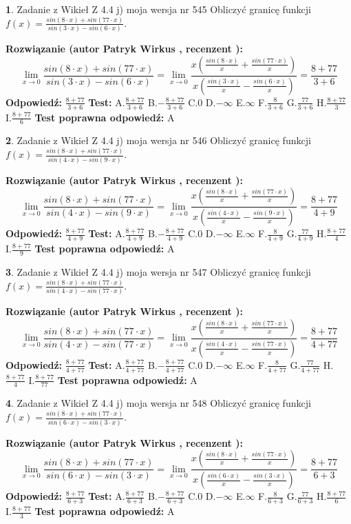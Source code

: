 \documentclass[12pt, a4paper]{article}
\theoremstyle{definition} %
\newtheorem{zad}{}
\newcommand{\zadStart}[1]{\begin{zad}#1\newline}
\newcommand{\zadStop}{\end{zad}}
\newcommand{\rozwStart}[2]{\noindent \textbf{Rozwiązanie (autor #1 , recenzent #2): }\newline}
\newcommand{\rozwStop}{\newline}
\newcommand{\odpStart}{\noindent \textbf{Odpowiedź:}\newline}
\newcommand{\odpStop}{\newline}
\newcommand{\testStart}{\noindent \textbf{Test:}\newline}
\newcommand{\testStop}{\newline}
\newcommand{\kluczStart}{\noindent \textbf{Test poprawna odpowiedź:}\newline}
\newcommand{\kluczStop}{\newline}
\begin{document}
\zadStart{Zadanie z Wikieł Z 4.4 j) moja wersja nr 545}
Obliczyć granicę funkcji $f(x)=\frac{sin(8\cdot x) +sin(77\cdot x)}{sin(3\cdot x) -sin(6\cdot x)}$.
\zadStop
\rozwStart{Patryk Wirkus}{}
$$\lim\limits_{x\to 0}\frac{sin(8\cdot x) +sin(77\cdot x)}{sin(3\cdot x) -sin(6\cdot x)}=\lim\limits_{x\to 0}\frac{x(\frac{sin(8\cdot x)}{x}+\frac{sin(77\cdot x)}{x})}{x(\frac{sin(3\cdot x)}{x}-\frac{sin(6\cdot x)}{x})}=\frac{8+77}{3+6}$$
\rozwStop
\odpStart
$\frac{8+77}{3+6}$
\odpStop
\testStart
A.$\frac{8+77}{3+6}$
B.$-\frac{8+77}{3+6}$
C.$0$
D.$-\infty$
E.$\infty$
F.$\frac{8}{3+6}$
G.$\frac{77}{3+6}$
H.$\frac{8+77}{3}$
I.$\frac{8+77}{6}$
\testStop
\kluczStart
A
\kluczStop



\zadStart{Zadanie z Wikieł Z 4.4 j) moja wersja nr 546}
Obliczyć granicę funkcji $f(x)=\frac{sin(8\cdot x) +sin(77\cdot x)}{sin(4\cdot x) -sin(9\cdot x)}$.
\zadStop
\rozwStart{Patryk Wirkus}{}
$$\lim\limits_{x\to 0}\frac{sin(8\cdot x) +sin(77\cdot x)}{sin(4\cdot x) -sin(9\cdot x)}=\lim\limits_{x\to 0}\frac{x(\frac{sin(8\cdot x)}{x}+\frac{sin(77\cdot x)}{x})}{x(\frac{sin(4\cdot x)}{x}-\frac{sin(9\cdot x)}{x})}=\frac{8+77}{4+9}$$
\rozwStop
\odpStart
$\frac{8+77}{4+9}$
\odpStop
\testStart
A.$\frac{8+77}{4+9}$
B.$-\frac{8+77}{4+9}$
C.$0$
D.$-\infty$
E.$\infty$
F.$\frac{8}{4+9}$
G.$\frac{77}{4+9}$
H.$\frac{8+77}{4}$
I.$\frac{8+77}{9}$
\testStop
\kluczStart
A
\kluczStop



\zadStart{Zadanie z Wikieł Z 4.4 j) moja wersja nr 547}
Obliczyć granicę funkcji $f(x)=\frac{sin(8\cdot x) +sin(77\cdot x)}{sin(4\cdot x) -sin(77\cdot x)}$.
\zadStop
\rozwStart{Patryk Wirkus}{}
$$\lim\limits_{x\to 0}\frac{sin(8\cdot x) +sin(77\cdot x)}{sin(4\cdot x) -sin(77\cdot x)}=\lim\limits_{x\to 0}\frac{x(\frac{sin(8\cdot x)}{x}+\frac{sin(77\cdot x)}{x})}{x(\frac{sin(4\cdot x)}{x}-\frac{sin(77\cdot x)}{x})}=\frac{8+77}{4+77}$$
\rozwStop
\odpStart
$\frac{8+77}{4+77}$
\odpStop
\testStart
A.$\frac{8+77}{4+77}$
B.$-\frac{8+77}{4+77}$
C.$0$
D.$-\infty$
E.$\infty$
F.$\frac{8}{4+77}$
G.$\frac{77}{4+77}$
H.$\frac{8+77}{4}$
I.$\frac{8+77}{77}$
\testStop
\kluczStart
A
\kluczStop



\zadStart{Zadanie z Wikieł Z 4.4 j) moja wersja nr 548}
Obliczyć granicę funkcji $f(x)=\frac{sin(8\cdot x) +sin(77\cdot x)}{sin(6\cdot x) -sin(3\cdot x)}$.
\zadStop
\rozwStart{Patryk Wirkus}{}
$$\lim\limits_{x\to 0}\frac{sin(8\cdot x) +sin(77\cdot x)}{sin(6\cdot x) -sin(3\cdot x)}=\lim\limits_{x\to 0}\frac{x(\frac{sin(8\cdot x)}{x}+\frac{sin(77\cdot x)}{x})}{x(\frac{sin(6\cdot x)}{x}-\frac{sin(3\cdot x)}{x})}=\frac{8+77}{6+3}$$
\rozwStop
\odpStart
$\frac{8+77}{6+3}$
\odpStop
\testStart
A.$\frac{8+77}{6+3}$
B.$-\frac{8+77}{6+3}$
C.$0$
D.$-\infty$
E.$\infty$
F.$\frac{8}{6+3}$
G.$\frac{77}{6+3}$
H.$\frac{8+77}{6}$
I.$\frac{8+77}{3}$
\testStop
\kluczStart
A
\kluczStop
\end{document}
